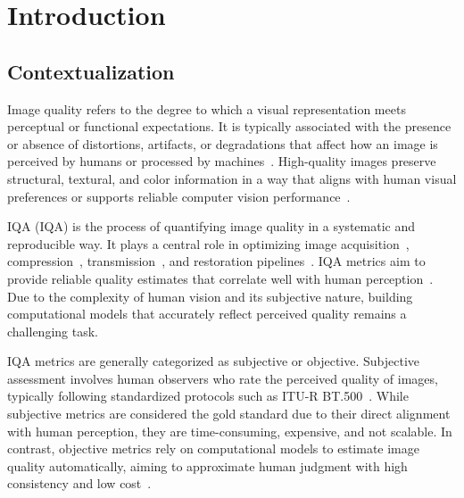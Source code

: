 \chapter{Introduction}\label{chap:introduction}

\section{Contextualization}\label{sec:contextualization}

Image quality refers to the degree to which a visual representation meets perceptual or functional expectations. It is typically associated with the presence or absence of distortions, artifacts, or degradations that affect how an image is perceived by humans or processed by machines~\cite{survey2006wang, survey2019thung, shahrukh2019survey}. High-quality images preserve structural, textural, and color information in a way that aligns with human visual preferences or supports reliable computer vision performance~\cite{sheikh_vif_2006, zhang_lpips_2018}.

\acl{IQA} (\acs{IQA}) is the process of quantifying image quality in a systematic and reproducible way. It plays a central role in optimizing image acquisition~\cite{ciancio_blur_assessment_2011}, compression~\cite{wang_no_reference_jpeg_2002}, transmission~\cite{engelke_wireless_iqa_2010}, and restoration pipelines~\cite{dabov_bm3d_2007}. \acs{IQA} metrics aim to provide reliable quality estimates that correlate well with human perception~\cite{wang_ssim_2004, FullReference2024}. Due to the complexity of human vision and its subjective nature, building computational models that accurately reflect perceived quality remains a challenging task.

\acs{IQA} metrics are generally categorized as subjective or objective. Subjective assessment involves human observers who rate the perceived quality of images, typically following standardized protocols such as ITU-R BT.500~\cite{itu_bt500_2023}. While subjective metrics are considered the gold standard due to their direct alignment with human perception, they are time-consuming, expensive, and not scalable. In contrast, objective metrics rely on computational models to estimate image quality automatically, aiming to approximate human judgment with high consistency and low cost~\cite{zaric_comparison_objective_subjective, sheikh_vif_2006}.

